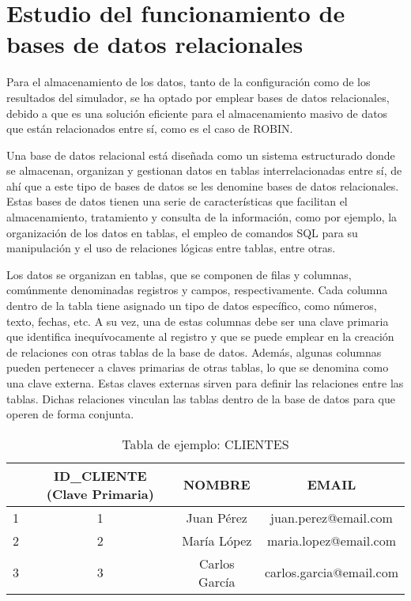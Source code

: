 \section{Estudio del funcionamiento de bases de datos relacionales}
\label{sec:estudioBasesDeDatos}

Para el almacenamiento de los datos, tanto de la configuración como de los resultados del simulador, se ha optado por emplear bases de datos relacionales, debido a que es una solución eficiente para el almacenamiento masivo de datos que están relacionados entre sí, como es el caso de \acrshort{ROBIN}. 

Una base de datos relacional está diseñada como un sistema estructurado donde se almacenan, organizan y gestionan datos en tablas interrelacionadas entre sí, de ahí que a este tipo de bases de datos se les denomine bases de datos relacionales. Estas bases de datos tienen una serie de características que facilitan el almacenamiento, tratamiento y consulta de la información, como por ejemplo, la organización de los datos en tablas, el empleo de comandos SQL para su manipulación y el uso de relaciones lógicas entre tablas, entre otras.



Los datos se organizan en tablas, que se componen de filas y columnas, comúnmente denominadas registros y campos, respectivamente. Cada columna dentro de la tabla tiene asignado un tipo de datos específico, como números, texto, fechas, etc. A su vez, una de estas columnas debe ser una clave primaria que identifica inequívocamente al registro y que se puede emplear en la creación de relaciones con otras tablas de la base de datos. Además, algunas columnas pueden pertenecer a claves primarias de otras tablas, lo que se denomina como una clave externa. Estas claves externas sirven para definir las relaciones entre las tablas. Dichas relaciones vinculan las tablas dentro de la base de datos para que operen de forma conjunta.  

\begin{table}[H]
\centering
\begin{tabular}{r|c|c|c|}
\cline{2-4}
 & \cellcolor[HTML]{C0C0C0}ID\_CLIENTE (\textbf{Clave Primaria}) & \cellcolor[HTML]{C0C0C0}NOMBRE & \cellcolor[HTML]{C0C0C0}EMAIL \\ \hline
\multicolumn{1}{|r|}{1} & 1 & Juan Pérez    & juan.perez@email.com    \\ \hline
\multicolumn{1}{|r|}{2} & 2 & María López   & maria.lopez@email.com   \\ \hline
\multicolumn{1}{|r|}{3} & 3 & Carlos García & carlos.garcia@email.com \\ \hline
\end{tabular}
\caption{Tabla de ejemplo: CLIENTES}
\label{tab:ejemploTablaClientes}
\end{table}

